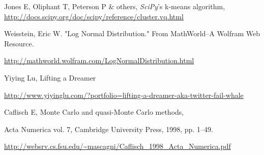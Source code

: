 \documentclass{report}
\begin{document}
\begin{thebibliography}{9}
 Jones E, Oliphant T, Peterson P \& others, \emph{SciPy}'s k-means algorithm, \url{http://docs.scipy.org/doc/scipy/reference/cluster.vq.html}

 Weisstein, Eric W. "Log Normal Distribution." From MathWorld--A Wolfram Web Resource.

\url{http://mathworld.wolfram.com/LogNormalDistribution.html}

 Yiying Lu, Lifting a Dreamer

\url{http://www.yiyinglu.com/?portfolio=lifting-a-dreamer-aka-twitter-fail-whale}

 Caflisch E, Monte Carlo and quasi-Monte Carlo methods,

Acta Numerica vol. 7, Cambridge University Press, 1998, pp. 1–49.

\url{http://websrv.cs.fsu.edu/~mascagni/Caflisch_1998_Acta_Numerica.pdf}

\end{thebibliography}
\end{document}
